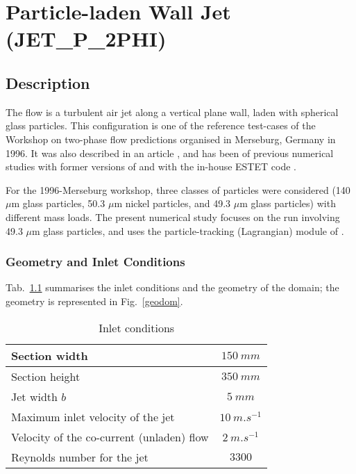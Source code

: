 \renewcommand{\IMAGES}{./IMAGES} %

\chapter{Particle-laden Wall Jet (JET\_P\_2PHI)}


\section{Description}

The flow is a turbulent air jet along a vertical plane wall, laden with spherical glass particles. This configuration is one of the reference test-cases of the Workshop on two-phase flow predictions organised in Merseburg, Germany in 1996. It was also described in an article \cite{Sato1996}, and has been of previous numerical studies with former versions of \CS and with the in-house ESTET code \cite{validestetlag, Our_95}.

For the 1996-Merseburg workshop, three classes of particles were considered (140 $\mu$m glass particles, 50.3 $\mu$m nickel particles, and 49.3 $\mu$m glass particles) with different mass loads. The present numerical study focuses on the run involving 49.3 $\mu$m glass particles, and uses the particle-tracking (Lagrangian) module of \CS \cite{RefB-4}.


\subsection{Geometry and Inlet Conditions}

Tab.~\ref{inletcond} summarises the inlet conditions and the geometry of the domain; the geometry is represented in Fig.~\ref{geodom}.

\begin{table}[H]
\begin{center}
\begin{tabular}{|l|c|} \hline
Section width                             &   $150~mm$  \\ \hline
Section height                            &   $350~mm$  \\ \hline
Jet width $b$                             &   $5~mm$    \\ \hline
Maximum inlet velocity of the jet         &   $10~m.s^{-1}$  \\ \hline
Velocity of the co-current (unladen) flow &   $2~m.s^{-1}$   \\ \hline
Reynolds number for the jet               &   $3300$    \\ \hline
\end{tabular}
\end{center}
\caption{Inlet conditions}
\label{inletcond}
\end{table}

